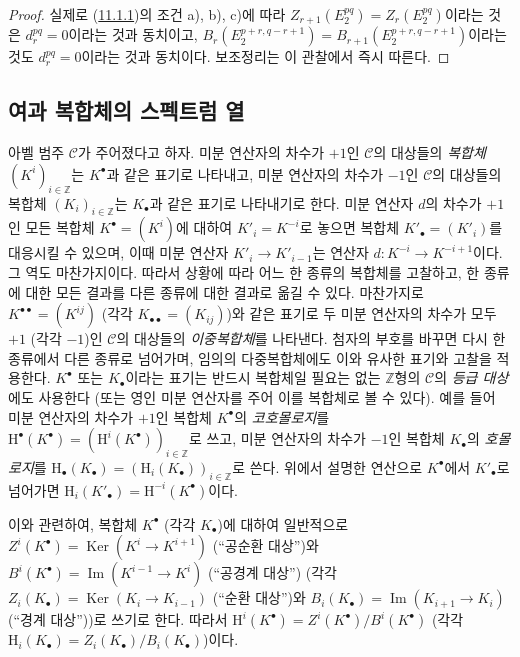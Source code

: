 \begin{proof}
실제로 (\hyperref[0.11.1.1-fr]{11.1.1})의 조건 a), b), c)에 따라
$Z_{r+1}(E_2^{pq})=Z_r(E_2^{pq})$이라는 것은 $d_r^{pq}=0$이라는
것과 동치이고,
$B_r(E_2^{p+r,q-r+1})=B_{r+1}(E_2^{p+r,q-r+1})$이라는 것도
$d_r^{pq}=0$이라는 것과 동치이다. 보조정리는 이 관찰에서 즉시 따른다.
\end{proof}

\subsection{여과 복합체의 스펙트럼 열}
\label{subsection:0.11.2-fr}

\begin{env}[11.2.1]
\label{0.11.2.1-fr}
아벨 범주 $\mathcal C$가 주어졌다고 하자. 미분 연산자의 차수가 $+1$인
$\mathcal C$의 대상들의 \emph{복합체} $(K^i)_{i\in\mathbb Z}$는
$K^\bullet$과 같은 표기로 나타내고, 미분 연산자의 차수가 $-1$인
$\mathcal C$의 대상들의 복합체 $(K_i)_{i\in\mathbb Z}$는 $K_\bullet$과 같은
표기로 나타내기로 한다. 미분 연산자 $d$의 차수가 $+1$인 모든 복합체
$K^\bullet=(K^i)$에 대하여 $K'_i=K^{-i}$로 놓으면 복합체
$K'_\bullet=(K'_i)$를 대응시킬 수 있으며, 이때 미분 연산자
$K'_i\to K'_{i-1}$는 연산자 $d:K^{-i}\to K^{-i+1}$이다. 그 역도
마찬가지이다. 따라서 상황에 따라 어느 한 종류의 복합체를 고찰하고, 한
종류에 대한 모든 결과를 다른 종류에 대한 결과로 옮길 수 있다. 마찬가지로
$K^{\bullet\bullet}=(K^{ij})$ (각각 $K_{\bullet\bullet}=(K_{ij})$)와 같은
표기로 두 미분 연산자의 차수가 모두 $+1$ (각각 $-1$)인 $\mathcal C$의
대상들의 \emph{이중복합체}를 나타낸다. 첨자의 부호를 바꾸면 다시 한
종류에서 다른 종류로 넘어가며, 임의의 다중복합체에도 이와 유사한 표기와
고찰을 적용한다. $K^\bullet$ 또는 $K_\bullet$이라는 표기는 반드시 복합체일
필요는 없는 $\mathbb Z$형의 $\mathcal C$의 \emph{등급 대상}에도 사용한다
(또는 영인 미분 연산자를 주어 이를 복합체로 볼 수 있다). 예를 들어 미분
연산자의 차수가 $+1$인 복합체 $K^\bullet$의 \emph{코호몰로지}를
$\mathrm H^\bullet(K^\bullet)=(\mathrm H^i(K^\bullet))_{i\in\mathbb Z}$로
쓰고, 미분 연산자의 차수가 $-1$인 복합체 $K_\bullet$의
\emph{호몰로지}를
$\mathrm H_\bullet(K_\bullet)=(\mathrm H_i(K_\bullet))_{i\in\mathbb Z}$로
쓴다. 위에서 설명한 연산으로 $K^\bullet$에서 $K'_\bullet$로 넘어가면
$\mathrm H_i(K'_\bullet)=\mathrm H^{-i}(K^\bullet)$이다.

이와 관련하여, 복합체 $K^\bullet$ (각각 $K_\bullet$)에 대하여 일반적으로
$Z^i(K^\bullet)=\operatorname{Ker}(K^i\to K^{i+1})$ (``공순환 대상'')와
$B^i(K^\bullet)=\operatorname{Im}(K^{i-1}\to K^i)$ (``공경계 대상'')
(각각 $Z_i(K_\bullet)=\operatorname{Ker}(K_i\to K_{i-1})$ (``순환 대상'')와
$B_i(K_\bullet)=\operatorname{Im}(K_{i+1}\to K_i)$ (``경계 대상''))로
쓰기로 한다. 따라서
$\mathrm H^i(K^\bullet)=Z^i(K^\bullet)/B^i(K^\bullet)$ (각각
$\mathrm H_i(K_\bullet)=Z_i(K_\bullet)/B_i(K_\bullet)$)이다.


\end{env}
